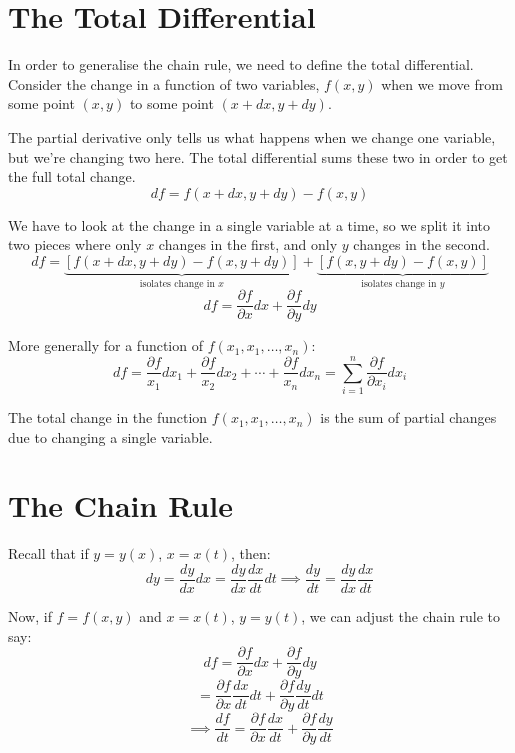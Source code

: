 
\section{The Total Differential}
In order to generalise the chain rule, we need to define the total differential. Consider the change in a function of two variables, $f(x, y)$ when we move from some point $(x, y)$ to some point $(x + dx, y+dy)$.

The partial derivative only tells us what happens when we change one variable, but we're changing two here. The total differential sums these two in order to get the full total change.
\[
    df = f(x + dx, y+dy) - f(x, y)
\]

We have to look at the change in a single variable at a time, so we split it into two pieces where only $x$ changes in the first, and only $y$ changes in the second.
\[
    df = \underbrace{\left[ f(x + dx, y + dy) - f(x, y + dy) \right]}_{\text{isolates change in } x} + \underbrace{\left[ f(x, y + dy) - f(x, y) \right]}_{\text{isolates change in } y}
\]
\[
    df = \frac{\partial f}{\partial x} dx + \frac{\partial f}{\partial y} dy
\]

More generally for a function of $f(x_1, x_1, \ldots, x_n)$:
\[
    df = \frac{\partial f}{x_1} dx_1 + \frac{\partial f}{x_2} dx_2 + \cdots + \frac{\partial f}{x_n} dx_n = \sum_{i=1}^{n} \frac{\partial f}{\partial x_i} dx_i
\]

The total change in the function  $f(x_1, x_1, \ldots, x_n)$ is the sum of partial changes due to changing a single variable.

\section{The Chain Rule}
Recall that if $y = y(x)$, $x = x(t)$, then:
\[
    dy = \frac{dy}{dx} dx = \frac{dy}{dx} \frac{dx}{dt} dt \implies \frac{dy}{dt} = \frac{dy}{dx} \frac{dx}{dt}
\]

Now, if $f = f(x, y)$ and $x = x(t)$, $y = y(t)$, we can adjust the chain rule to say:
\[
    df = \frac{\partial f}{\partial x} dx + \frac{\partial f}{\partial y} dy
\]
\[
    = \frac{\partial f}{\partial x} \frac{dx}{dt} dt + \frac{\partial f}{\partial y} \frac{dy}{dt} dt
\]
\[
    \implies \frac{df}{dt} = \frac{\partial f}{\partial x} \frac{dx}{dt} + \frac{\partial f}{\partial y} \frac{dy}{dt}
\]

